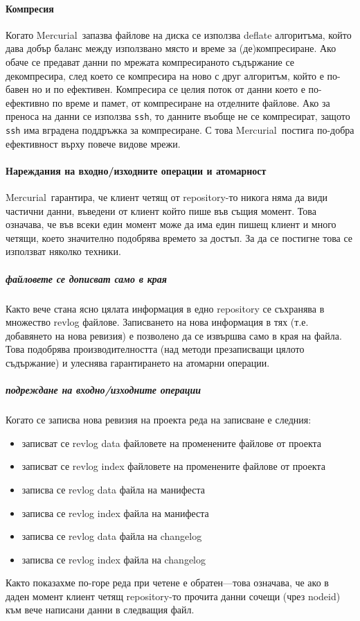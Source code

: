 \documentclass[a4paper]{article}
\def\Hg{Mercurial}
\begin{document}
    \paragraph{Компресия}
    Когато \Hg\ запазва файлове на диска се използва deflate\cite{deflate}
    алгоритъма, който дава добър баланс между използвано място и време за
    (де)компресиране. Ако обаче се предават данни по мрежата компресираното
    съдържание се декомпресира, след което се компресира на ново с друг
    алгоритъм, който е по-бавен но и по ефективен. Компресира се целия поток от
    данни което е по-ефективно по време и памет, от компресиране на отделните
    файлове. Ако за преноса на данни се използва \texttt{ssh}\cite{ssh}, то
    данните въобще не се компресират, защото \texttt{ssh} има вградена
    поддръжка за компресиране. С това \Hg\ постига по-добра ефективност върху
    повече видове мрежи.

    \paragraph{Нареждания на входно/изходните операции и атомарност}
    \Hg\ гарантира, че клиент четящ от repository-то никога няма да види
    частични данни, въведени от клиент който пише във същия момент. Това
    означава, че във всеки един момент може да има един пишещ клиент и много
    четящи, което значително подобрява времето за достъп. За да се постигне
    това се използват няколко техники.
      \subparagraph{файловете се дописват само в края}
      Както вече стана ясно цялата информация в едно repository се съхранява
      в множество revlog файлове. Записването на нова информация в тях (т.е.
      добавянето на нова ревизия) е позволено да се извършва само в края на
      файла. Това подобрява производителността (над методи презаписващи цялото
      съдържание) и улеснява гарантирането на атомарни операции.

      \subparagraph{подреждане на входно/изходните операции}
      Когато се записва нова ревизия на проекта реда на записване е следния:
      \begin{itemize}
        \item записват се revlog data файловете на променените файлове от проекта
        \item записват се revlog index файловете на променените файлове от проекта
        \item записва се revlog data файла на манифеста
        \item записва се revlog index файла на манифеста
        \item записва се revlog data файла на changelog
        \item записва се revlog index файла на changelog
      \end{itemize}
      Както показахме по-горе реда при четене е обратен---това означава, че ако
      в даден момент клиент четящ repository-то прочита данни сочещи (чрез
      nodeid) към вече написани данни в следващия файл.
\end{document}
